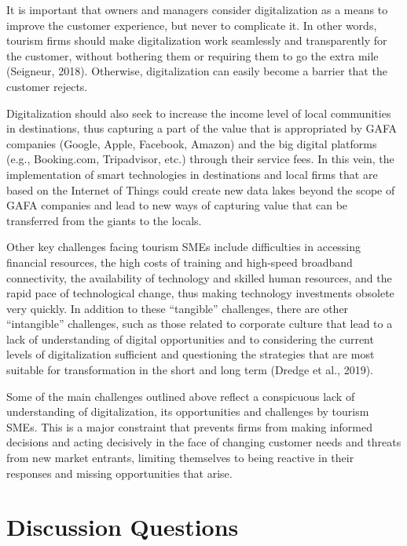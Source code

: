 \documentclass[
  letterpaper,
  DIV=11,
  numbers=noendperiod]{scrreprt}
\begin{document}
It is important that owners and managers consider digitalization as a
means to improve the customer experience, but never to complicate it. In
other words, tourism firms should make digitalization work seamlessly
and transparently for the customer, without bothering them or requiring
them to go the extra mile (Seigneur, 2018). Otherwise, digitalization
can easily become a barrier that the customer rejects.

Digitalization should also seek to increase the income level of local
communities in destinations, thus capturing a part of the value that is
appropriated by GAFA companies (Google, Apple, Facebook, Amazon) and the
big digital platforms (e.g., Booking.com, Tripadvisor, etc.) through
their service fees. In this vein, the implementation of smart
technologies in destinations and local firms that are based on the
Internet of Things could create new data lakes beyond the scope of GAFA
companies and lead to new ways of capturing value that can be
transferred from the giants to the locals.

Other key challenges facing tourism SMEs include difficulties in
accessing financial resources, the high costs of training and high-speed
broadband connectivity, the availability of technology and skilled human
resources, and the rapid pace of technological change, thus making
technology investments obsolete very quickly. In addition to these
``tangible'' challenges, there are other ``intangible'' challenges, such
as those related to corporate culture that lead to a lack of
understanding of digital opportunities and to considering the current
levels of digitalization sufficient and questioning the strategies that
are most suitable for transformation in the short and long term (Dredge
et al., 2019).

Some of the main challenges outlined above reflect a conspicuous lack of
understanding of digitalization, its opportunities and challenges by
tourism SMEs. This is a major constraint that prevents firms from making
informed decisions and acting decisively in the face of changing
customer needs and threats from new market entrants, limiting themselves
to being reactive in their responses and missing opportunities that
arise.

\hypertarget{discussion-questions-2}{%
\section{Discussion Questions}\label{discussion-questions-2}}
\end{document}
